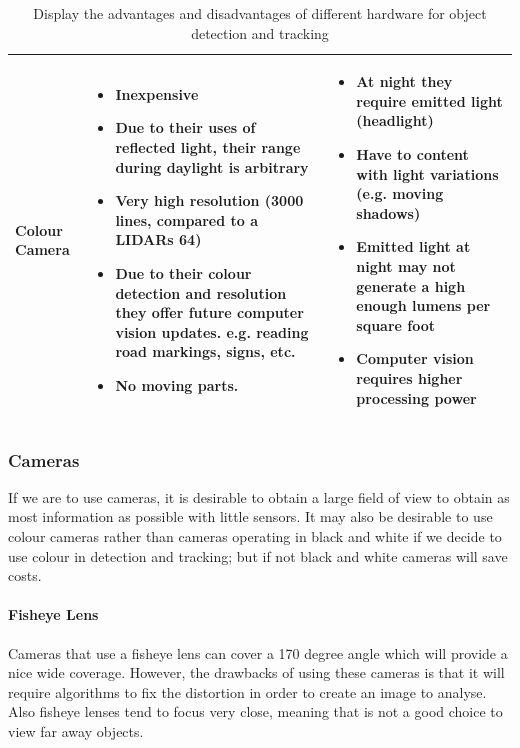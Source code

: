 \documentclass[a4paper]{report}
\begin{document}
\begin{table}[H]
{\begin{minipage}{\textwidth}
\begin{tabular}{ | m{3cm} | p{5cm} | p{5cm} |}
  Colour Camera &
  \begin{itemize}[leftmargin=*]   
    \item Inexpensive
    \item Due to their uses of reflected light, their range during daylight is arbitrary     	
    \item Very high resolution (3000 lines, compared to a LIDARs 64)    	
    \item Due to their colour detection and resolution they offer future computer vision updates. e.g. reading road markings, signs, etc.    	
    \item No moving parts.
  \end{itemize} &
  \begin{itemize}[leftmargin=*]   
    \item At night they require emitted light (headlight)
    \item Have to content with light variations (e.g. moving shadows)
    \item Emitted light at night may not generate a high enough lumens per square foot
    \item Computer vision requires higher processing power      
  \end{itemize} \\ \hline    
\end{tabular}


\caption[Table caption text]{Display the advantages and disadvantages of different hardware for object detection and tracking} 
\label{table:detect_hardware_comp}
\end{minipage} }
\end{table}

\subsubsection{Cameras}
If we are to use cameras, it is desirable to obtain a large field of view to obtain as most information as possible with little sensors. It may also be desirable to use colour cameras rather than cameras operating in black and white if we decide to use colour in detection and tracking; but if not black and white cameras will save costs. 

\paragraph{Fisheye Lens}Cameras that use a fisheye lens can cover a 170 degree angle which will provide a nice wide coverage. However, the drawbacks of using these cameras is that it will require algorithms to fix the distortion in order to create an image to analyse. Also fisheye lenses tend to focus very close, meaning that is not a good choice to view far away objects.
\end{document}
